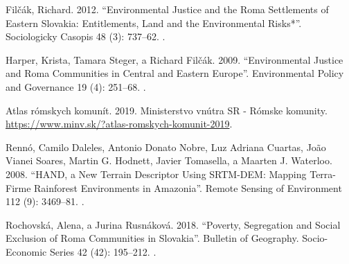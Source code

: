 {Filčák, Richard. 2012. “Environmental Justice and the Roma Settlements of Eastern Slovakia: Entitlements, Land and the Environmental Risks*”. Sociologicky Casopis 48 (3): 737–62. .
	
Harper, Krista, Tamara Steger, a Richard Filčák. 2009. “Environmental Justice and Roma Communities in Central and Eastern Europe”. Environmental Policy and Governance 19 (4): 251–68. .
	
Atlas rómskych komunít. 2019. Ministerstvo vnútra SR - Rómske komunity. \url{https://www.minv.sk/?atlas-romskych-komunit-2019}.
	
Rennó, Camilo Daleles, Antonio Donato Nobre, Luz Adriana Cuartas, João Vianei Soares, Martin G. Hodnett, Javier Tomasella, a Maarten J. Waterloo. 2008. “HAND, a New Terrain Descriptor Using SRTM-DEM: Mapping Terra-Firme Rainforest Environments in Amazonia”. Remote Sensing of Environment 112 (9): 3469–81. .
	
Rochovská, Alena, a Jurina Rusnáková. 2018. “Poverty, Segregation and Social Exclusion of Roma Communities in Slovakia”. Bulletin of Geography. Socio-Economic Series 42 (42): 195–212. .
}%

